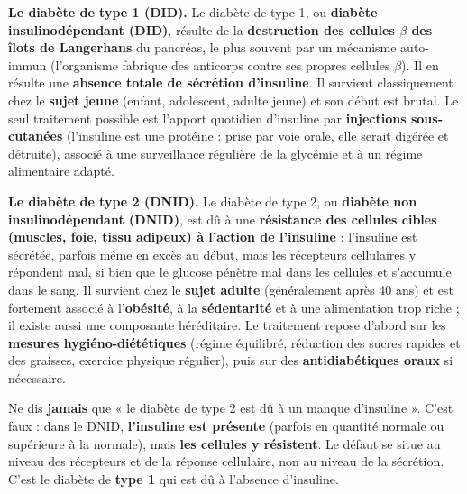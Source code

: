 \documentclass[11pt]{article}
\newcommand{\cle}[1]{{\popxbold\color{popdark}#1}}
\begin{document}
\textbf{Le diabète de type 1 (DID).} Le \cle{diabète de type 1}, ou \textbf{diabète insulinodépendant (DID)}, résulte de la \textbf{destruction des cellules $\beta$ des îlots de Langerhans} du pancréas, le plus souvent par un mécanisme auto-immun (l'organisme fabrique des anticorps contre ses propres cellules $\beta$). Il en résulte une \textbf{absence totale de sécrétion d'insuline}. Il survient classiquement chez le \textbf{sujet jeune} (enfant, adolescent, adulte jeune) et son début est brutal. Le seul traitement possible est l'apport quotidien d'insuline par \textbf{injections sous-cutanées} (l'insuline est une protéine : prise par voie orale, elle serait digérée et détruite), associé à une surveillance régulière de la glycémie et à un régime alimentaire adapté.

\textbf{Le diabète de type 2 (DNID).} Le \cle{diabète de type 2}, ou \textbf{diabète non insulinodépendant (DNID)}, est dû à une \textbf{résistance des cellules cibles (muscles, foie, tissu adipeux) à l'action de l'insuline} : l'insuline est sécrétée, parfois même en excès au début, mais les récepteurs cellulaires y répondent mal, si bien que le glucose pénètre mal dans les cellules et s'accumule dans le sang. Il survient chez le \textbf{sujet adulte} (généralement après 40 ans) et est fortement associé à l'\textbf{obésité}, à la \textbf{sédentarité} et à une alimentation trop riche ; il existe aussi une composante héréditaire. Le traitement repose d'abord sur les \textbf{mesures hygiéno-diététiques} (régime équilibré, réduction des sucres rapides et des graisses, exercice physique régulier), puis sur des \textbf{antidiabétiques oraux} si nécessaire.

\begin{attention}
Ne dis \textbf{jamais} que « le diabète de type 2 est dû à un manque d'insuline ». C'est faux : dans le DNID, \textbf{l'insuline est présente} (parfois en quantité normale ou supérieure à la normale), mais \textbf{les cellules y résistent}. Le défaut se situe au niveau des récepteurs et de la réponse cellulaire, non au niveau de la sécrétion. C'est le diabète de \textbf{type 1} qui est dû à l'absence d'insuline.
\end{attention}
\end{document}
